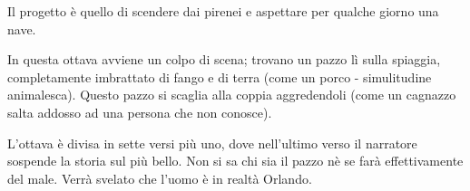 \documentclass[a4paper]{article}
\begin{document}
\begin{center} %
\begin{minipage}{0.5\textwidth}
\centering
{}
\end{minipage}
\end{center}

Il progetto è quello di scendere dai pirenei e aspettare per qualche giorno una nave.

\begin{center} %
\begin{minipage}{0.5\textwidth}
\centering
{}
\end{minipage}
\end{center}

In questa ottava avviene un colpo di scena; trovano un pazzo lì sulla spiaggia,
completamente imbrattato di fango e di terra (come un porco - simulitudine animalesca).
Questo pazzo si scaglia alla coppia aggredendoli
(come un cagnazzo salta addosso ad una persona che non conosce).

L'ottava è divisa in sette versi più uno, dove nell'ultimo verso
il narratore sospende la storia sul più bello.
Non si sa chi sia il pazzo nè se farà effettivamente del male.
Verrà svelato che l'uomo è in realtà Orlando.
\end{document}
